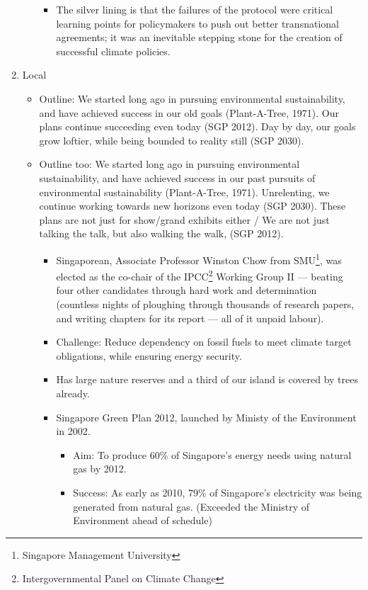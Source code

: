 \documentclass[oneside]{book}
\begin{document}
\begin{enumerate}
\begin{itemize}
\begin{itemize}
            \item The silver lining is that the failures of the protocol were critical learning points for policymakers to push out better transnational agreements; it was an inevitable stepping stone for the creation of successful climate policies. 
        \end{itemize}
    \end{itemize}
        \item Local
    \begin{itemize}
        \item Outline: We started long ago in pursuing environmental sustainability, and have achieved success in our old goals (Plant-A-Tree, 1971). Our plans continue succeeding even today (SGP 2012). Day by day, our goals grow loftier, while being bounded to reality still (SGP 2030).  
        \item Outline too: We started long ago in pursuing environmental sustainability, and have achieved success in our past pursuits of environmental sustainability (Plant-A-Tree, 1971). Unrelenting, we continue working towards new horizons even today (SGP 2030). These plans are not just for show/grand exhibits either / We are not just talking the talk, but also walking the walk, (SGP 2012). 
        \begin{itemize}
            \item Singaporean, Associate Professor Winston Chow from SMU\footnote{Singapore Management University}, was elected as the co-chair of the IPCC\footnote{Intergovernmental Panel on Climate Change
            } Working Group II --- beating four other candidates through hard work and determination \footnotesize(countless nights of ploughing through thousands of research papers, and writing chapters for its report --- all of it unpaid labour)\normalsize.
            \item Challenge: Reduce dependency on fossil fuels to meet climate target obligations, while ensuring energy security.
            \item Has large nature reserves and a third of our island is covered by trees already.
            \item Singapore Green Plan 2012, launched by Ministy of the Environment in 2002. 
            \begin{itemize}
                \item Aim: To produce 60\% of Singapore's energy needs using natural gas by 2012. 
                \item Success: As early as 2010, 79\% of Singapore's electricity was being generated from natural gas. (Exceeded the Ministry of Environment ahead of schedule)

\end{itemize}
\end{itemize}
\end{itemize}
\end{enumerate}
\end{document}
